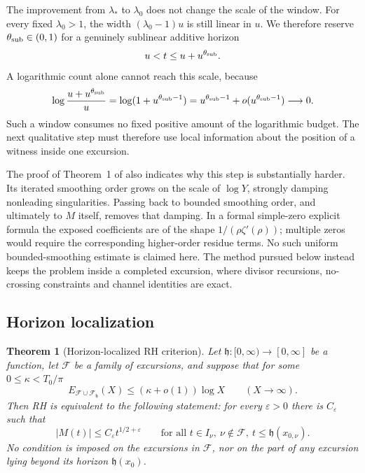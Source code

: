 \documentclass[11pt,reqno]{amsart}
\makeatletter
\let\CG@origcite\cite
\renewcommand*{\cite}[2][]{\def\CG@citekey{#2}%
  \ifx\relax#1\relax\CG@origcite{#2}\else\CG@origcite[#1]{#2}\fi}
\numberwithin{equation}{section}
\theoremstyle{plain}
\newtheorem{theorem}{Theorem}[section]
\theoremstyle{definition}
\theoremstyle{remark}
\newcommand{\eps}{\varepsilon}
\newcommand{\F}{\mathcal{F}}
\makeatother
\begin{document}
The improvement from $\lambda_*$ to $\lambda_0$ does not change the scale of
the window.  For every fixed $\lambda_0>1$, the width
$(\lambda_0-1)u$ is still linear in $u$.  We therefore reserve
$\theta_{\rm sub}\in(0,1)$ for a genuinely sublinear additive horizon
\begin{equation}
 u<t\le u+u^{\theta_{\rm sub}}.
\end{equation}
A logarithmic count alone cannot reach this scale, because
\begin{equation}
 \log\frac{u+u^{\theta_{\rm sub}}}{u}
 =\log(1+u^{\theta_{\rm sub}-1})
 =u^{\theta_{\rm sub}-1}+o(u^{\theta_{\rm sub}-1})\longrightarrow0.
\end{equation}
Such a window consumes no fixed positive amount of the logarithmic budget.
The next qualitative step must therefore use local information about the
position of a witness inside one excursion.

The proof of Theorem~1 of \cite{KP86} also indicates why this step is
substantially harder.  Its iterated smoothing order grows on the scale of
$\log Y$, strongly damping nonleading singularities.  Passing back to
bounded smoothing order, and ultimately to $M$ itself, removes that damping.
In a formal simple-zero explicit formula the exposed coefficients are of the
shape $1/(\rho\zeta'(\rho))$; multiple zeros would require the corresponding
higher-order residue terms.  No such uniform bounded-smoothing estimate is
claimed here.  The method pursued below instead keeps the problem inside a
completed excursion, where divisor recursions, no-crossing constraints and
channel identities are exact.


\subsection{Horizon localization}
\label{subsec:horizon}

\begin{theorem}[Horizon-localized RH criterion]
\label{thm:horizon}
Let $\mathfrak h:[0,\infty)\to[0,\infty]$ be a function, let $\F$ be a family
of excursions, and suppose that for some $0\le\kappa<T_0/\pi$
\begin{equation}
\label{eq:horizon-hyp}
E_{\F\cup\F_{\mathfrak h}}(X)\le(\kappa+o(1))\log X\qquad(X\to\infty).
\end{equation}
Then RH is equivalent to the following statement: for every $\eps>0$ there
is $C_\eps$ such that
\begin{equation}
\label{eq:restricted-RH}
|M(t)|\le C_\eps t^{1/2+\eps}
\qquad\text{for all }t\in I_\nu,\ \nu\notin\F,\ t\le \mathfrak h(x_{0,\nu}).
\end{equation}
No condition is imposed on the excursions in $\F$, nor on the part of any
excursion lying beyond its horizon $\mathfrak h(x_0)$.
\end{theorem}
\end{document}

